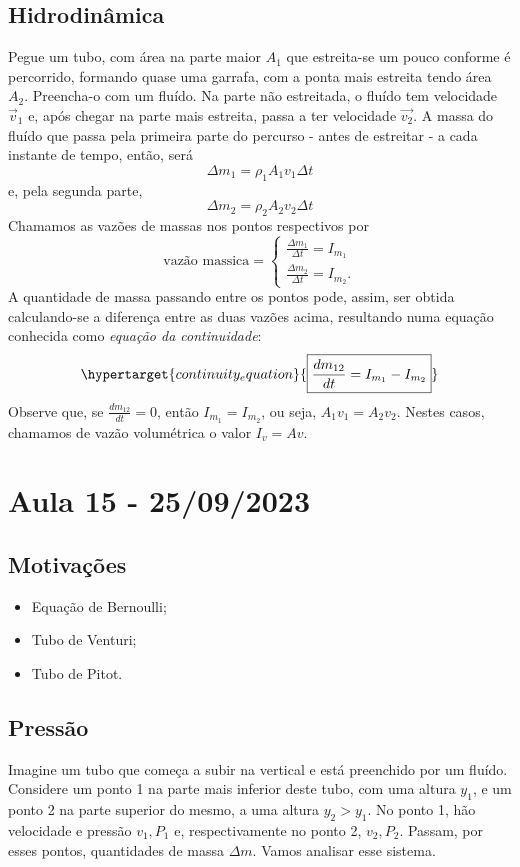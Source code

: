 \documentclass{article}
\begin{document}
\subsection{Hidrodinâmica}
Pegue um tubo, com área na parte maior \(A_{1}\) que estreita-se um pouco conforme é percorrido, formando quase uma garrafa, com a ponta mais estreita tendo área \(A_{2}\).
Preencha-o com um fluído. Na parte não estreitada, o fluído tem velocidade \(\vec{v}_{1}\) e, após chegar na parte mais estreita, passa a ter velocidade \(\vec{v_{2}}\).
A massa do fluído que passa pela primeira parte do percurso - antes de estreitar - a cada instante de tempo, então, será 
\[
  \Delta m_{1} = \rho_{1}A_{1}v_{1}\Delta t
\]
e, pela segunda parte, 
\[
  \Delta m_{2} = \rho_{2}A_{2}v_{2}\Delta t
\]
Chamamos as vazões de massas nos pontos respectivos por 
\[
  \text{vazão massica} = \left\{\begin{array}{ll}
      \frac{\Delta m_{1}}{\Delta t} = I_{m_{1}}\\
      \frac{\Delta m_{2}}{\Delta t} = I_{m_{2}}.
  \end{array}\right.
\]
A quantidade de massa passando entre os pontos pode, assim, ser obtida calculando-se a diferença entre as duas vazões acima,
resultando numa equação conhecida como \textit{equação da continuidade}:
\[
  \hypertarget{continuity_equation}{\boxed{\frac{dm_{12}}{dt} = I_{m_{1}}-I_{m_{2}}}}
\]
Observe que, se \(\frac{dm_{12}}{dt} = 0\), então \(I_{m_{1}} = I_{m_{2}}\), ou seja, \(A_{1}v_{1}=A_{2}v_{2}\). Nestes casos, chamamos de vazão
volumétrica o valor \(I_{v}=Av\).
\newpage

\section{Aula 15 - 25/09/2023}
\subsection{Motivações}
\begin{itemize}
  \item Equação de Bernoulli;
  \item Tubo de Venturi;
  \item Tubo de Pitot.
\end{itemize}
\subsection{Pressão}
Imagine um tubo que começa a subir na vertical e está preenchido por um fluído. Considere um ponto 1 na parte mais inferior deste tubo, com uma altura \(y_{1}\),
e um ponto 2 na parte superior do mesmo, a uma altura \(y_{2} > y_{1}\). No ponto 1, hão velocidade e pressão \(v_{1}, P_{1}\) e, respectivamente no ponto 2, \(v_{2}, P_{2}\).
Passam, por esses pontos, quantidades de massa \(\Delta m\). Vamos analisar esse sistema.
\end{document}
